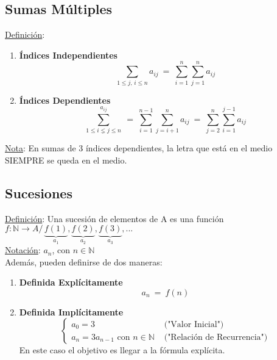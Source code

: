 \documentclass{article}
\newcommand{\comma}{,\,}                                %
\newcommand{\tq}{/\,}                                   %
\newcommand{\eq}{\:=\:}                                 %
\newcommand{\naturales}{\mathbb{N}}                     %
\newcommand{\sumatoria}[2]{\sum_{#1} ^{#2}}             %
\begin{document}
\subsection{Sumas Múltiples}
\underline{Definición}:
\begin{enumerate}
    \item \textbf{Índices Independientes}
    \begin{equation*}
        \sumatoria{1 \leq j \comma i \leq n}{} a_{ij} \eq \sumatoria{i=1}{n} \sumatoria{j=1}{n} a_{ij}
    \end{equation*}
    \item \textbf{Índices Dependientes}
    \begin{equation*}
        \sumatoria{1 \leq i \lneq j \leq n}{a_{ij}} \eq \sumatoria{i=1}{n-1} \sumatoria{j=i+1}{n} a_{ij} \eq \sumatoria{j=2}{n} \sumatoria{i=1}{j-1} a_{ij}
    \end{equation*}
\end{enumerate}
\underline{Nota}: En sumas de 3 índices dependientes, la letra que está en el medio \\SIEMPRE se queda en el medio.

\subsection{Sucesiones}
\underline{Definición}: Una sucesión de elementos de A es una función $f: \naturales \rightarrow A \tq \underbrace{f(1)}_{a_1},\underbrace{f(2)}_{a_2},\underbrace{f(3)}_{a_3},...$
\\\underline{Notación}: $a_n$, con $n \in \naturales$
\\Además, pueden definirse de dos maneras:
\begin{enumerate}
    \item \textbf{Definida Explícitamente}
    \begin{equation*}
        a_n \eq f(n)
    \end{equation*}
    \item \textbf{Definida Implícitamente}
        \begin{equation*}
            \begin{cases}
                a_0=3 &\text{ ("Valor Inicial")} \\
                a_n = 3a_{n-1} \text{ con } n \in \naturales &\text{ ("Relación de Recurrencia")}
            \end{cases}
    \end{equation*}
    En este caso el objetivo es llegar a la fórmula explícita.
\end{enumerate}
\end{document}
